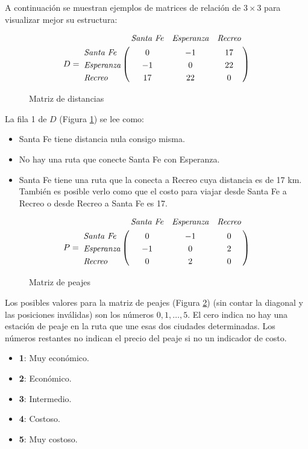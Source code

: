 \documentclass[conference,a4paper,10pt,oneside,final]{tfmpd}
\begin{document}
A continuación se muestran ejemplos de matrices de relación de $3\times3$ para visualizar mejor su estructura:

\begin{figure}[!h]
\begin{align*}
D = \bordermatrix{
~                 & \textit{Santa Fe} & \textit{Esperanza} & \textit{Recreo} \cr
\textit{Santa Fe} & 0                 & -1                  & 17 			  \cr
\textit{Esperanza}& -1                & 0                   & 22              \cr
\textit{Recreo}   & 17                & 22                  & 0}
\end{align*}
\caption{Matriz de distancias}
\label{fig:MD}
\end{figure}

La fila 1 de $D$ (Figura \ref{fig:MD}) se lee como:

\begin{itemize}
\item Santa Fe tiene distancia nula consigo misma.
\item No hay una ruta que conecte Santa Fe con Esperanza.
\item Santa Fe tiene una ruta que la conecta a Recreo cuya distancia es de 17 km. También es posible verlo como que el costo para viajar desde Santa Fe a Recreo o desde Recreo a Santa Fe es 17.
\end{itemize}

\begin{figure}[!h]
\begin{align*}
P = \bordermatrix{
~                 & \textit{Santa Fe} & \textit{Esperanza} & \textit{Recreo} \cr
\textit{Santa Fe} & 0                 & -1                  & 0 			  \cr
\textit{Esperanza}& -1                & 0                   & 2               \cr
\textit{Recreo}   & 0                 & 2                   & 0}
\end{align*}
\caption{Matriz de peajes}
\label{fig:MP}
\end{figure}

Los posibles valores para la matriz de peajes (Figura \ref{fig:MP}) (sin contar la diagonal y las posiciones inválidas) son los números $0,1,\dots,5$. El cero indica no hay una estación de peaje en la ruta que une esas dos ciudades determinadas. Los números restantes no indican el precio del peaje si no un indicador de costo.

\begin{itemize}
\item \textbf{1}: Muy económico.
\item \textbf{2}: Económico.
\item \textbf{3}: Intermedio.
\item \textbf{4}: Costoso.
\item \textbf{5}: Muy costoso.
\end{itemize}
\end{document}
